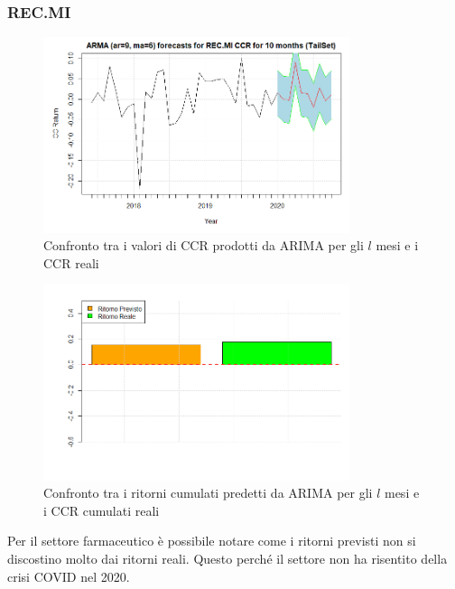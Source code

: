 \documentclass[12pt]{article}
\begin{document}
\subsubsection{REC.MI}
\begin{figure}[!htb]
    \centering
    \includegraphics[width=0.8\textwidth]{immagini/foreREC.png}
    \caption{Confronto tra i valori di CCR prodotti da ARIMA per gli $l$ mesi e i CCR reali}
\end{figure}
\FloatBarrier
\begin{figure}[!htb]
    \centering
    \includegraphics[width=0.8\textwidth]{immagini/foreRECbar.png}
    \caption{Confronto tra i ritorni cumulati predetti da ARIMA per gli $l$ mesi e i CCR cumulati reali}
\end{figure}
\FloatBarrier
Per il settore farmaceutico è possibile notare come i ritorni previsti non si discostino molto dai ritorni reali. Questo perché il settore non ha risentito della crisi COVID nel 2020.
\newpage
\end{document}
